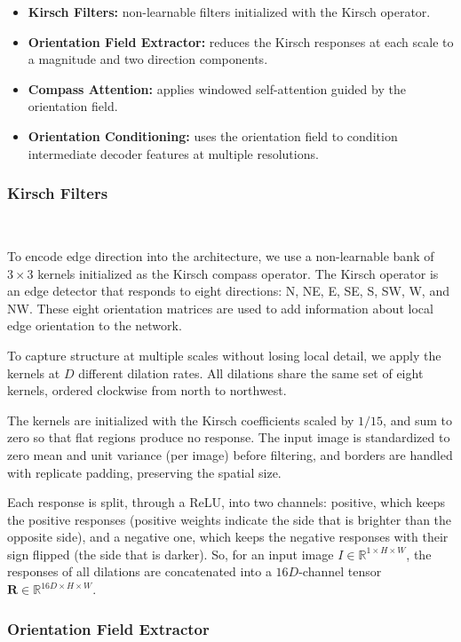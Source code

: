 \documentclass[sigconf]{acmart}
\begin{document}
\begin{itemize}
    \item \textbf{Kirsch Filters:} non-learnable filters initialized with the Kirsch operator.
    \item \textbf{Orientation Field Extractor:} reduces the Kirsch responses at each scale to a magnitude and two direction components.
    \item \textbf{Compass Attention:} applies windowed self-attention guided by the orientation field.
    \item \textbf{Orientation Conditioning:} uses the orientation field to condition intermediate decoder features at multiple resolutions.
\end{itemize}

\subsubsection{Kirsch Filters}\mbox{}\ 

To encode edge direction into the architecture, we use a non-learnable bank of $3 \times 3$ kernels initialized as the Kirsch compass operator. The Kirsch operator is an edge detector that responds to eight directions: N, NE, E, SE, S, SW, W, and NW. These eight orientation matrices are used to add information about local edge orientation to the network. 

To capture structure at multiple scales without losing local detail, we apply the kernels at $D$ different dilation rates. All dilations share the same set of eight kernels, ordered clockwise from north to northwest. 

The kernels are initialized with the Kirsch coefficients scaled by $1/15$, and sum to zero so that flat regions produce no response. The input image is standardized to zero mean and unit variance (per image) before filtering, and borders are handled with replicate padding, preserving the spatial size.

Each response is split, through a ReLU, into two channels: positive, which keeps the positive responses (positive weights indicate the side that is brighter than the opposite side), and a negative one, which keeps the negative responses with their sign flipped (the side that is darker). So, for an input image $I \in \mathbb{R}^{1 \times H \times W}$, the responses of all dilations are concatenated into a $16D$-channel tensor $\mathbf{R} \in \mathbb{R}^{16D \times H \times W}$.

\subsubsection{Orientation Field Extractor}\mbox{}\
\end{document}
